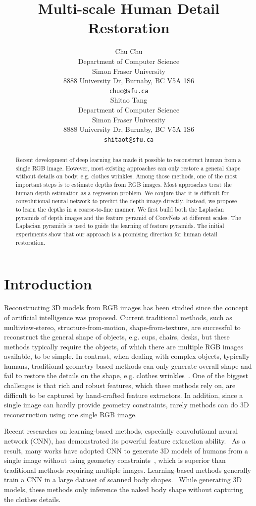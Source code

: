 \documentclass{article} %
\title{Multi-scale Human Detail Restoration}
\author{
Chu Chu \\
Department of Computer Science\\
Simon Fraser University\\
8888 University Dr, Burnaby, BC V5A 1S6 \\
\texttt{chuc@sfu.ca} \\
\And
Shitao Tang \\
Department of Computer Science\\
Simon Fraser University\\
8888 University Dr, Burnaby, BC V5A 1S6 \\
\texttt{shitaot@sfu.ca} \\
}
\begin{document}
\maketitle

\begin{abstract}
Recent development of deep learning has made it possible to reconstruct  human from a single RGB image. However, most existing approaches can only restore a general shape without details on body, e.g. clothes wrinkles. Among those methods, one of the most important steps is to estimate depths from RGB images. Most approaches treat the human depth estimation as a regression problem. We conjure that it is difficult for convolutional neural network to predict the depth image directly. Instead, we propose to learn the depths in a coarse-to-fine manner. We first build both the Laplacian pyramids of depth images and the feature pyramid of ConvNets at different scales. The Laplacian pyramids is used to guide the learning of feature pyramids. The initial experiments show that our approach is a promising  direction for human detail restoration.
\end{abstract}

\section{Introduction}
Reconstructing 3D models from RGB images has been studied since the concept of artificial intelligence was proposed. Current traditional methods, such as multiview-stereo, structure-from-motion, shape-from-texture, are successful to reconstruct the general shape of objects, e.g. cups, chairs, desks, but these methods typically require the objects, of which there are multiple RGB images available, to be simple. In contrast, when dealing with complex objects, typically humans, traditional geometry-based methods can only generate overall shape and fail to restore the details on the shape, e.g. clothes wrinkles~\cite{izadi2011kinectfusion,wu2017marrnet,newell2016stacked,li2015maximum,toshev2014deeppose}. One of the biggest challenges is that rich and robust features, which these methods rely on, are difficult to be captured by hand-crafted feature extractors. In addition, since a single image can hardly provide geometry constraints, rarely methods can do 3D reconstruction using one single RGB image.

Recent researches on learning-based methods, especially convolutional neural network (CNN), has demonstrated its powerful feature extraction ability.~\cite{he2016deep,simonyan2014very} As a result, many works have adopted CNN to generate 3D models of humans from a single image without using geometry constraints~\cite{tang2019neural,fan2017point}, which is superior than traditional methods requiring multiple images. Learning-based methods generally train a CNN in a large dataset of scanned body shapes.~\cite{tang2019neural} While generating 3D models, these methods only inference the naked body shape without capturing the clothes details. 
\end{document}

